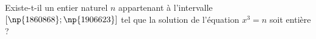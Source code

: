 
Existe-t-il un entier naturel $n$ appartenant à l'intervalle $[ \np{1860868};\np{1906623}]$ tel que la solution de l'équation $x^3=n$ soit entière ?
 

